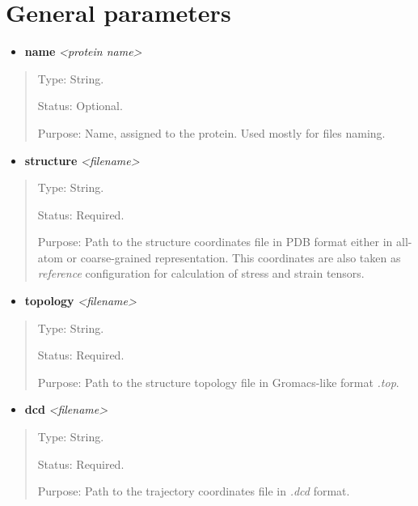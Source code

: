 \documentclass[letterpaper,10pt,english]{sphinxmanual}
\begin{document}
\section{General parameters}
\label{general:general-parameters}\begin{itemize}
\item {} 
\textbf{name} \emph{\textless{}protein name\textgreater{}}

\end{itemize}
\begin{quote}

Type: String.

Status: Optional.

Purpose: Name, assigned to the protein. Used mostly for files naming.
\end{quote}
\begin{itemize}
\item {} 
\textbf{structure} \emph{\textless{}filename\textgreater{}}

\end{itemize}
\begin{quote}

Type: String.

Status: Required.

Purpose: Path to the structure coordinates file in PDB format either in all-atom or coarse-grained representation. This coordinates are also taken as \emph{reference} configuration for calculation of stress and strain tensors.
\end{quote}
\begin{itemize}
\item {} 
\textbf{topology} \emph{\textless{}filename\textgreater{}}

\end{itemize}
\begin{quote}

Type: String.

Status: Required.

Purpose:  Path to the structure topology file in Gromacs-like format \emph{.top}.
\end{quote}
\begin{itemize}
\item {} 
\textbf{dcd} \emph{\textless{}filename\textgreater{}}

\end{itemize}
\begin{quote}

Type: String.

Status: Required.

Purpose:  Path to the trajectory coordinates file in \emph{.dcd} format.
\end{quote}
\end{document}
